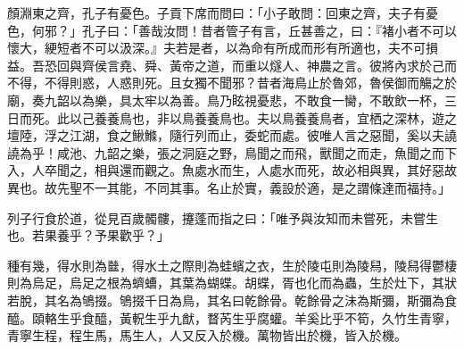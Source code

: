 \begin{pinyinscope}
顏淵東之齊，孔子有憂色。子貢下席而問曰：「小子敢問：回東之齊，夫子有憂色，何邪？」孔子曰：「善哉汝問！昔者管子有言，丘甚善之，曰：『褚小者不可以懷大，綆短者不可以汲深。』夫若是者，以為命有所成而形有所適也，夫不可損益。吾恐回與齊侯言堯、舜、黃帝之道，而重以燧人、神農之言。彼將內求於己而不得，不得則惑，人惑則死。且女獨不聞邪？昔者海鳥止於魯郊，魯侯御而觴之於廟，奏九韶以為樂，具太牢以為善。鳥乃眩視憂悲，不敢食一臠，不敢飲一杯，三日而死。此以己養養鳥也，非以鳥養養鳥也。夫以鳥養養鳥者，宜栖之深林，遊之壇陸，浮之江湖，食之鰍鰷，隨行列而止，委蛇而處。彼唯人言之惡聞，奚以夫譊譊為乎！咸池、九韶之樂，張之洞庭之野，鳥聞之而飛，獸聞之而走，魚聞之而下入，人卒聞之，相與還而觀之。魚處水而生，人處水而死，故必相與異，其好惡故異也。故先聖不一其能，不同其事。名止於實，義設於適，是之謂條達而福持。」

列子行食於道，從見百歲髑髏，攓蓬而指之曰：「唯予與汝知而未嘗死，未嘗生也。若果養乎？予果歡乎？」

種有幾，得水則為㡭，得水土之際則為蛙蠙之衣，生於陵屯則為陵舄，陵舄得鬱棲則為烏足，烏足之根為蠐螬，其葉為蝴蝶。胡蝶，胥也化而為蟲，生於灶下，其狀若脫，其名為鴝掇。鴝掇千日為鳥，其名曰乾餘骨。乾餘骨之沬為斯彌，斯彌為食醯。頤輅生乎食醯，黃軦生乎九猷，瞀芮生乎腐蠸。羊奚比乎不筍，久竹生青寧，青寧生程，程生馬，馬生人，人又反入於機。萬物皆出於機，皆入於機。


\end{pinyinscope}